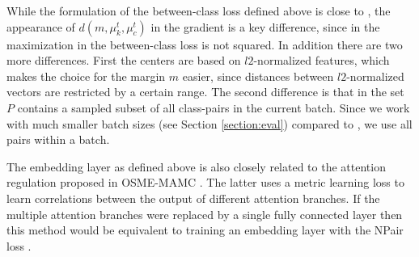 \documentclass[10pt,twocolumn,letterpaper]{article}
\begin{document}
While the formulation of the between-class loss defined above is close to \cite{hanselmann2017deep}, the appearance of $d(m,\mu_k^t,\mu_c^t)$ in the gradient is a key difference, since in \cite{hanselmann2017deep} the maximization in the between-class loss is not squared. In addition there are two more differences. First the centers are based on $l2$-normalized features, which makes the choice for the margin $m$ easier, since distances between $l2$-normalized vectors are restricted by a certain range. 
The second difference is that in \cite{hanselmann2017deep} the set $P$ contains a sampled subset of all class-pairs in the current batch. Since we work with much smaller batch sizes (see Section \ref{section:eval}) compared to \cite{hanselmann2017deep}, we use all pairs within a batch.

The embedding layer as defined above is also closely related to the attention regulation proposed in OSME-MAMC \cite{sun2018multi}. The latter uses a metric learning loss to learn correlations between the output of different attention branches. If the multiple attention branches were replaced by a single fully connected layer then this method would be equivalent to training an embedding layer with the NPair loss \cite{sohn2016improved}.
\end{document}
